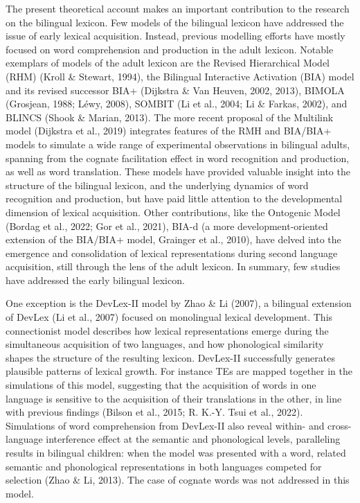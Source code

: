 \documentclass[
  12pt,
  b5paperpaper,
  twoside]{scrreprt}
\begin{document}
The present theoretical account makes an important contribution to the
research on the bilingual lexicon. Few models of the bilingual lexicon
have addressed the issue of early lexical acquisition. Instead, previous
modelling efforts have mostly focused on word comprehension and
production in the adult lexicon. Notable exemplars of models of the
adult lexicon are the Revised Hierarchical Model (RHM) (Kroll \&
Stewart, 1994), the Bilingual Interactive Activation (BIA) model and its
revised successor BIA+ (Dijkstra \& Van Heuven, 2002, 2013), BIMOLA
(Grosjean, 1988; Léwy, 2008), SOMBIT (Li et al., 2004; Li \& Farkas,
2002), and BLINCS (Shook \& Marian, 2013). The more recent proposal of
the Multilink model (Dijkstra et al., 2019) integrates features of the
RMH and BIA/BIA+ models to simulate a wide range of experimental
observations in bilingual adults, spanning from the cognate facilitation
effect in word recognition and production, as well as word translation.
These models have provided valuable insight into the structure of the
bilingual lexicon, and the underlying dynamics of word recognition and
production, but have paid little attention to the developmental
dimension of lexical acquisition. Other contributions, like the
Ontogenic Model (Bordag et al., 2022; Gor et al., 2021), BIA-d (a more
development-oriented extension of the BIA/BIA+ model, Grainger et al.,
2010), have delved into the emergence and consolidation of lexical
representations during second language acquisition, still through the
lens of the adult lexicon. In summary, few studies have addressed the
early bilingual lexicon.

One exception is the DevLex-II model by Zhao \& Li (2007), a bilingual
extension of DevLex (Li et al., 2007) focused on monolingual lexical
development. This connectionist model describes how lexical
representations emerge during the simultaneous acquisition of two
languages, and how phonological similarity shapes the structure of the
resulting lexicon. DevLex-II successfully generates plausible patterns
of lexical growth. For instance TEs are mapped together in the
simulations of this model, suggesting that the acquisition of words in
one language is sensitive to the acquisition of their translations in
the other, in line with previous findings (Bilson et al., 2015; R. K.-Y.
Tsui et al., 2022). Simulations of word comprehension from DevLex-II
also reveal within- and cross-language interference effect at the
semantic and phonological levels, paralleling results in bilingual
children: when the model was presented with a word, related semantic and
phonological representations in both languages competed for selection
(Zhao \& Li, 2013). The case of cognate words was not addressed in this
model.
\end{document}
